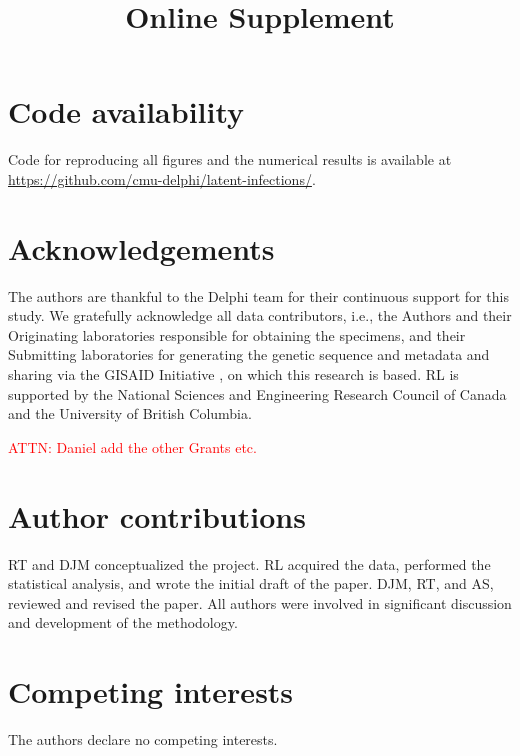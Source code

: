 \documentclass{article}
\newcommand{\beginsupplement}{
  \setcounter{table}{0}  
  \renewcommand{\thetable}{S\arabic{table}} 
  \setcounter{figure}{0} 
  \renewcommand{\thefigure}{S\arabic{figure}}
  \setcounter{section}{0} 
  \renewcommand{\thesection}{S\arabic{section}}
}
\newcommand{\attn }[1]{\textcolor{red}{ATTN: #1}}
\begin{document}
\section*{Code availability}
Code for reproducing all figures and the numerical results is 
available at 
\href{https://github.com/cmu-delphi/latent-infections/}{https://github.com/cmu-delphi/latent-infections/}.

\clearpage
%




\section*{Acknowledgements}

The authors are thankful to the Delphi team for their continuous support for
this study. We gratefully acknowledge all data contributors, i.e., the Authors
and their Originating laboratories responsible for obtaining the specimens, and
their Submitting laboratories for generating the genetic sequence and metadata
and sharing via the GISAID Initiative \citep{elbe2017data}, on which this
research is based. %
RL is supported by the National Sciences and Engineering Research Council of 
Canada and the University of British Columbia.

\attn{Daniel add the other Grants etc.}

\section*{Author contributions}
RT and DJM conceptualized the project. RL acquired the data, performed the
statistical analysis, and wrote the initial draft of the paper. DJM, RT, and AS,
reviewed and revised the paper. All authors were involved in significant
discussion and development of the methodology.

\section*{Competing interests}

The authors declare no competing interests.

\clearpage
\beginsupplement
\title{\supptitlefont Online Supplement}
\maketitle


\end{document}
